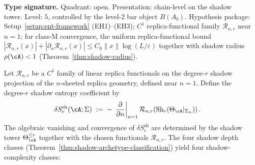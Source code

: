 \begin{proposition}
\label{prop:ent-complexity-classification}
\textbf{Type signature.}  Quadrant: open.  Presentation: chain-level
on the shadow tower.  Level: $5$, controlled by the level-$2$ bar
object $B(A_b)$.  Hypothesis package: Setup~\ref{setup:ent-framework}
(EH1)--(EH3); $C^1$ replica-functional family $\mathcal R_{n,r}$ near
$n=1$; for class-M convergence, the uniform replica-functional bound
$|\mathcal R_{n,r}(x)|+|\partial_n\mathcal R_{n,r}(x)|\le
C_0\|x\|\log(L/\varepsilon)$ together with shadow radius $\rho(\cA)<1$
\textup{(}Theorem~\ref{thm:shadow-radius}\textup{)}.

Let $\mathcal R_{n,r}$ be a $C^1$ family of linear replica
functionals on the degree-$r$ shadow projection of the
$n$-sheeted replica geometry, defined near $n=1$.  Define the
degree-$r$ shadow entropy coefficient by
\[
\delta S_r^{\mathrm{sh}}(\cA;\Sigma)
\;:=\;
-\,\left.\frac{\partial}{\partial n}\right|_{n=1}
\mathcal R_{n,r}\!\left(
\Sh_r(\Theta_\cA|_{\Sigma_n})\right).
\]
The algebraic vanishing and convergence of
$\delta S_r^{\mathrm{sh}}$ are determined by the shadow tower
$\Theta_\cA^{\le r}$ together with the chosen functionals
$\mathcal R_{n,r}$.
The four shadow depth classes
\textup{(}Theorem~\textup{\ref{thm:shadow-archetype-classification}}\textup{)}
yield four shadow-complexity classes:


\end{proposition}
